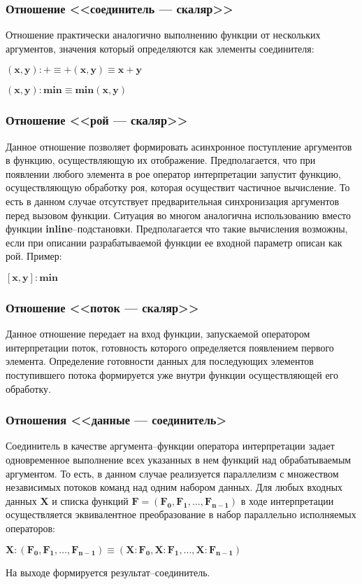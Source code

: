 \subsubsection{Отношение <<соединитель --- скаляр>>}

Отношение практически аналогично выполнению функции от нескольких аргументов, значения который определяются как элементы соединителя:
\begin{center}
	$\mathbf{(x, y):+ \equiv +(x, y) \equiv x + y}$

	$\mathbf{(x, y):min \equiv min(x, y)}$
\end{center}

\subsubsection{Отношение <<рой --- скаляр>>}

Данное отношение позволяет формировать асинхронное поступление аргументов в функцию, осуществляющую их отображение. Предполагается, что при появлении любого элемента в рое оператор интерпретации запустит функцию, осуществляющую обработку роя, которая осуществит частичное вычисление. То есть в данном случае отсутствует предварительная синхронизация аргументов перед вызовом функции. Ситуация во многом аналогична использованию вместо функции \textbf{inline}--подстановки. Предполагается что такие вычисления возможны, если при описании разрабатываемой функции ее входной параметр описан как рой. Пример:
\begin{center}
	$\mathbf{[x, y]:min}$
\end{center}

\subsubsection{Отношение <<поток --- скаляр>>}

Данное отношение передает на вход функции, запускаемой оператором интерпретации поток, готовность которого определяется появлением первого элемента. Определение готовности данных для последующих элементов поступившего потока формируется уже внутри функции осуществляющей его обработку.

\subsubsection{Отношения <<данные --- соединитель>}

Соединитель в качестве аргумента--функции оператора интерпретации задает одновременное выполнение всех указанных в нем функций над обрабатываемым аргументом. То есть, в данном случае реализуется параллелизм с множеством независимых потоков команд над одним набором данных. Для любых входных данных $\mathbf{X}$ и списка функций $\mathbf{F=(F_0,F_1,..., F_{n-1})}$ в ходе интерпретации осуществляется эквивалентное преобразование в набор параллельно исполняемых операторов:
\begin{center}
	$\mathbf{X:(F_0,F_1,..., F_{n-1}) \equiv (X:F_0,X:F_1,..., X:F_{n-1})}$
\end{center}
На выходе формируется результат--соединитель.

